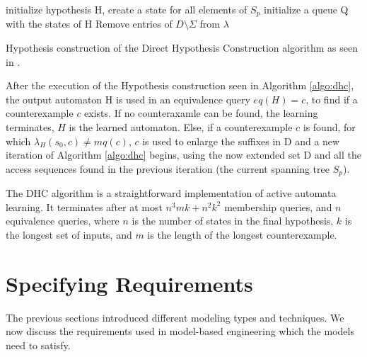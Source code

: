 \begin{algorithm}[H]
	\SetAlgoLined
	\DontPrintSemicolon
	initialize hypothesis H, create a state for all elements of $S_p$\;
	initialize a queue Q with the states of H\;
	Remove entries of $D\setminus\Sigma$ from $\lambda$\;
	\;
	\caption{Hypothesis construction of the Direct Hypothesis Construction algorithm as seen in \cite{Steffen2011}.}
	\label{algo:dhc}
\end{algorithm}

After the execution of the Hypothesis construction seen in Algorithm \ref{algo:dhc}, the output automaton H is used in an equivalence query $eq(H) = c$, to find if a counterexample $c$ exists. If no counteraxamle can be found, the learning terminates, $H$ is the learned automaton. Else, if a counterexample $c$ is found, for which $\lambda_H(s_0,c) \neq mq(c)$, $c$ is used to enlarge the suffixes in D and a new iteration of Algorithm \ref{algo:dhc} begins, using the now extended set D and all the access sequences found in the previous iteration (the current spanning tree $S_p$).

The DHC algorithm is a straightforward implementation of active automata learning. It terminates after at most $n^3mk+n^2k^2$ membership queries, and $n$ equivalence queries, where $n$ is the number of states in the final hypothesis, $k$ is the longest set of inputs, and $m$ is the length of the longest counterexample\cite{10.1007/978-3-642-34781-8_19}.

\clearpage
\section{Specifying Requirements} \label{sec_backgrspecreq}

The previous sections introduced different modeling types and techniques. We now discuss the requirements used in model-based engineering which the models need to satisfy.

